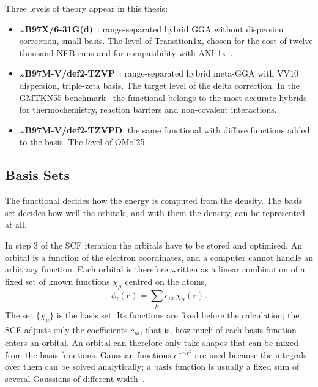 Three levels of theory appear in this thesis:

\begin{itemize}
  \item \textbf{$\omega$B97X/6-31G(d)}~\cite{chai2008}: range-separated
    hybrid GGA without dispersion correction, small basis. The level of
    Transition1x, chosen for the cost of twelve thousand NEB runs and for
    compatibility with ANI-1x~\cite{schreiner2022}.
  \item \textbf{$\omega$B97M-V/def2-TZVP}~\cite{mardirossian2016}:
    range-separated hybrid meta-GGA with VV10 dispersion, triple-zeta
    basis. The target level of the delta correction. In the GMTKN55
    benchmark~\cite{goerigk2017} the functional belongs to the most
    accurate hybrids for thermochemistry, reaction barriers and
    non-covalent interactions.
  \item \textbf{$\omega$B97M-V/def2-TZVPD}: the same functional with
    diffuse functions added to the basis. The level of OMol25.
\end{itemize}

\subsection{Basis Sets}
\label{sec:background-basis}

The functional decides how the energy is computed from the density. The
basis set decides how well the orbitals, and with them the density, can be
represented at all.

In step 3 of the SCF iteration the orbitals have to be stored and
optimised. An orbital is a function of the electron coordinates, and a
computer cannot handle an arbitrary function. Each orbital is therefore
written as a linear combination of a fixed set of known functions
$\chi_\mu$ centred on the atoms,
%
\begin{equation}
  \phi_i(\mathbf{r}) = \sum_\mu c_{\mu i}\, \chi_\mu(\mathbf{r}) .
\end{equation}
%
The set $\{\chi_\mu\}$ is the basis set. Its functions are fixed before the
calculation; the SCF adjusts only the coefficients $c_{\mu i}$, that is,
how much of each basis function enters an orbital. An orbital can therefore
only take shapes that can be mixed from the basis functions. Gaussian
functions $e^{-\alpha r^2}$ are used because the integrals over them can be
solved analytically; a basis function is usually a fixed sum of several
Gaussians of different width~\cite{jensen2017}.

